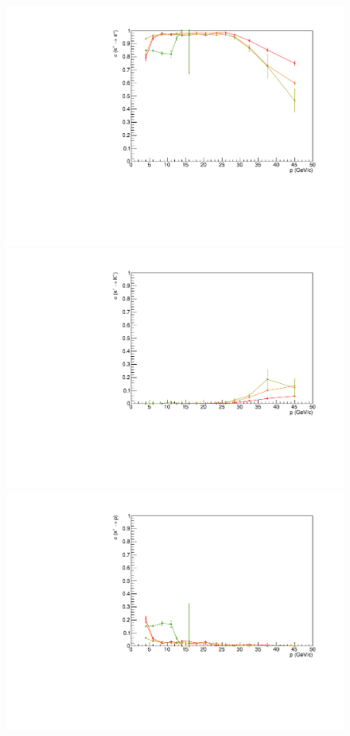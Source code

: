 \begin{figure}[!p]
  \centering
	\includegraphics[scale=0.35]{./gfx/pip_pi.pdf}
  \includegraphics[scale=0.35]{./gfx/pip_K.pdf}
  \includegraphics[scale=0.35]{./gfx/pip_p.pdf}

\end{figure}
